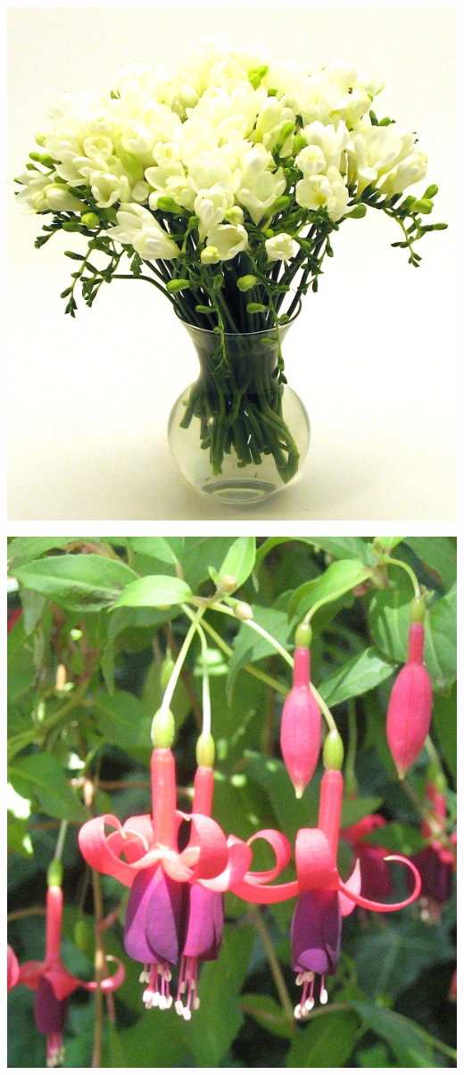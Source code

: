 \documentclass{article}
\begin{document}
\begin{center}
\includegraphics[width=0.9\textheight, angle=90]{../Freesia_white.jpg}
\end{center}
\newpage

\begin{center}
\includegraphics[width=0.9\textheight, angle=90]{../Fuchsia.jpg}
\end{center}
\newpage
\end{document}

